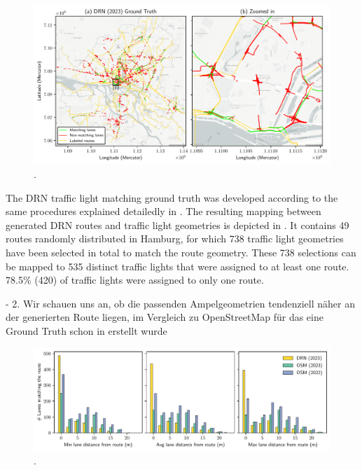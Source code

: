 \begin{figure}[htbp]
\centering 
\includegraphics[width=\linewidth]{images/matching-ground-truth-drn.pdf}
\caption{.}
\label{fig:matching-ground-truth-drn}
\end{figure}

The DRN traffic light matching ground truth was developed according to the same procedures explained detailedly in . The resulting mapping between generated DRN routes and traffic light geometries is depicted in . It contains 49 routes randomly distributed in Hamburg, for which 738 traffic light geometries have been selected in total to match the route geometry. These 738 selections can be mapped to 535 distinct traffic lights that were assigned to at least one route. 78.5\% (420) of traffic lights were assigned to only one route. 

- 2. Wir schauen uns an, ob die passenden Ampelgeometrien tendenziell näher an der generierten Route liegen, im Vergleich zu OpenStreetMap für das eine Ground Truth schon in  erstellt wurde

\begin{figure}[htbp]
\centering 
\includegraphics[width=\linewidth]{images/routing-lane-alignment.pdf}
\caption{.}
\label{fig:}
\end{figure}

